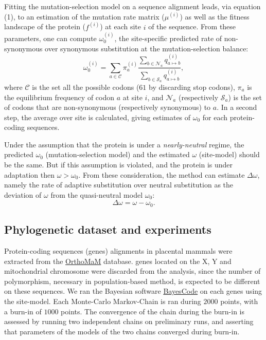 \documentclass{article}
\begin{document}
Fitting the mutation-selection model on a sequence alignment leads, via equation (1), to an estimation of the mutation rate matrix ($\mu^{(i)}$) as well as the fitness landscape of the protein ($f^{(i)}$) at each site $i$ of the sequence.
From these parameters, one can compute $\omega_{0}^{(i)}$, the site-specific predicted rate of non-synonymous over synonymous substitution at the mutation-selection balance:
\begin{equation}
	\omega_{0}^{(i)} = \sum_{a \in \mathcal{C}} \pi_a^{(i)} \dfrac{\sum_{b \in \mathcal{N}_a} q_{a \mapsto b}^{(i)}}{\sum_{b \in \mathcal{S}_a} q_{a \mapsto b}^{(i)}},
\end{equation}
where $\mathcal{C}$ is the set all the possible codons ($61$ by discarding stop codons), $\pi_a$ is the equilibrium frequency of codon $a$ at site $i$, and $\mathcal{N}_a$ (respectively $\mathcal{S}_a$) is the set of codons that are non-synonymous (respectively synonymous) to $a$\cite{spielman_relationship_2015, rodrigue_detecting_2016}.
In a second step, the average over site is calculated, giving estimates of $\omega_0$ for each protein-coding sequences.

Under the assumption that the protein is under a \textit{nearly-neutral} regime, the predicted $\omega_0$ (mutation-selection model) and the estimated $\omega$ (site-model) should be the same.
But if this assumption is violated, and the protein is under adaptation then $\omega > \omega_0$.
From these consideration, the method can estimate $\Delta \omega$, namely the rate of adaptive substitution over neutral substitution as the deviation of $\omega$ from the quasi-neutral model $\omega_0$:
\begin{equation}
	\Delta \omega = \omega - \omega_0.
\end{equation}

\subsection*{Phylogenetic dataset and experiments}
Protein-coding sequences (genes) alignments in placental mammals were extracted from the \href{http://www.orthomam.univ-montp2.fr}{OrthoMaM} database\cite{ranwez_orthomam_2007, douzery_orthomam_2014, scornavacca_orthomam_2019}.
genes located on the X, Y and mitochondrial chromosome were discarded from the analysis, since the number of polymorphism, necessary in population-based method, is expected to be different on these sequences.
We ran the Bayesian software \href{https://github.com/bayesiancook/bayescode}{BayesCode} on each genes using the site-model\cite{lartillot_phylobayes_2013, rodrigue_detecting_2016}.
Each Monte-Carlo Markov-Chain is ran during $2000$ points, with a burn-in of $1000$ points.
The convergence of the chain during the burn-in is assessed by running two independent chains on preliminary runs, and asserting that parameters of the models of the two chains converged during burn-in.
\end{document}
